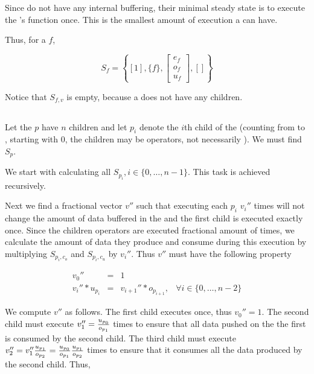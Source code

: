 Since {\filters} do not have any internal buffering, their minimal
steady state is to execute the {\filter}'s {\work} function once.
This is the smallest amount of execution a {\filter} can have.

Thus, for a {\filter} $f$,

\begin{displaymath}
S_f = \left\{[1], \{f\}, { \left[
\begin{array}{c}e_f\\o_f\\u_f
\end{array}
\right]}, [] \right\}
\end{displaymath}

Notice that $S_{f,v}$ is empty, because a {\filter} does not have
any children.

\subsection{\pipeline}

Let the {\pipeline} $p$ have $n$ children and let $p_i$ denote the
$i$th child of the {\pipeline} (counting from {\Input} to
{\Output}, starting with 0, the children may be operators, not
necessarily {\filters}). We must find $S_p$.

We start with calculating all $S_{p_i}, i \in \{0, \dots, n-1\}$.
This task is achieved recursively.

Next we find a fractional vector $v''$ such that executing each
$p_i$ $v_i''$ times will not change the amount of data buffered in
the {\pipeline} and the first child is executed exactly once.
Since the children operators are executed fractional amount of
times, we calculate the amount of data they produce and consume
during this execution by multiplying $S_{p_i,c_o}$ and
$S_{p_i,c_u}$ by $v_i''$. Thus $v''$ must have the following
property

\begin{displaymath}
\begin{array}{rclrr} v_0'' & = & 1 \\ v_i'' * u_{p_i}
& = & v_{i+1}'' * o_{p_{i+1}}, & \forall i \in \{0,\dots,n-2\}
\end{array}
\end{displaymath}

We compute $v''$ as follows.  The first child executes once, thus
$v_0'' = 1$.  The second child must execute $v_1'' = {u_{p_0}
\over {o_{p_1}}}$ times to ensure that all data pushed on the the
first {\Channel} is consumed by the second child.  The third
child must execute $v_2'' = v_1'' {u_{p_1} \over o_{p_2}} =
{u_{p_0} \over o_{p_1}} {u_{p_1} \over o_{p_2}}$ times to ensure
that it consumes all the data produced by the second child. Thus,

